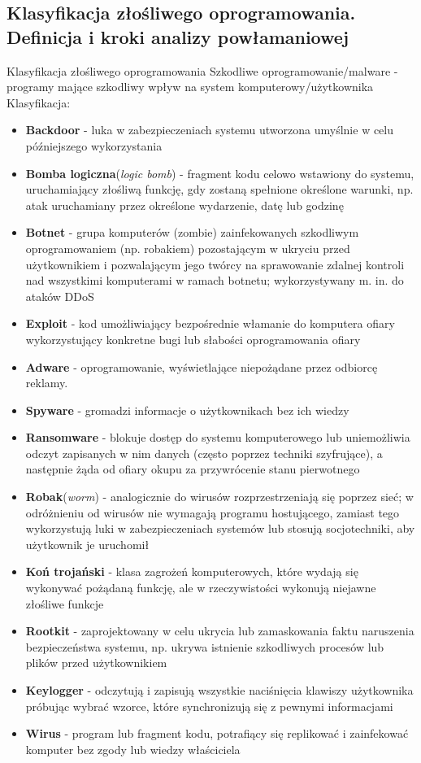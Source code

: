 \subsection{Klasyfikacja złośliwego oprogramowania. Definicja i kroki analizy powłamaniowej}

Klasyfikacja złośliwego oprogramowania Szkodliwe oprogramowanie/malware - programy mające szkodliwy wpływ na system komputerowy/użytkownika Klasyfikacja: 

\begin{itemize}
	\item \textbf{Backdoor} - luka w zabezpieczeniach systemu utworzona umyślnie w celu późniejszego wykorzystania 
	\item \textbf{Bomba logiczna}(\textit{logic bomb}) - fragment kodu celowo wstawiony do systemu, uruchamiający złośliwą funkcję, gdy zostaną spełnione określone warunki, np. atak uruchamiany przez określone wydarzenie, datę lub godzinę 
	\item \textbf{Botnet} - grupa komputerów (zombie) zainfekowanych szkodliwym oprogramowaniem (np. robakiem) pozostającym w ukryciu przed użytkownikiem i pozwalającym jego twórcy na sprawowanie zdalnej kontroli nad wszystkimi komputerami w ramach botnetu; wykorzystywany m. in. do ataków DDoS 
	\item \textbf{Exploit} - kod umożliwiający bezpośrednie włamanie do komputera ofiary wykorzystujący konkretne bugi lub słabości oprogramowania ofiary 
	\item \textbf{Adware} - oprogramowanie, wyświetlające niepożądane przez odbiorcę reklamy. 
	\item \textbf{Spyware} - gromadzi informacje o użytkownikach bez ich wiedzy 
	\item \textbf{Ransomware} - blokuje dostęp do systemu komputerowego lub uniemożliwia odczyt zapisanych w nim danych (często poprzez techniki szyfrujące), a następnie żąda od ofiary okupu za przywrócenie stanu pierwotnego 
	\item \textbf{Robak}(\textit{worm}) - analogicznie do wirusów rozprzestrzeniają się poprzez sieć; w odróżnieniu od wirusów nie wymagają programu hostującego, zamiast tego wykorzystują luki w zabezpieczeniach systemów lub stosują socjotechniki, aby użytkownik je uruchomił 
	\item \textbf{Koń trojański} - klasa zagrożeń komputerowych, które wydają się wykonywać pożądaną funkcję, ale w rzeczywistości wykonują niejawne złośliwe funkcje 
	\item \textbf{Rootkit} - zaprojektowany w celu ukrycia lub zamaskowania faktu naruszenia bezpieczeństwa systemu, np. ukrywa istnienie szkodliwych procesów lub plików przed użytkownikiem 
	\item \textbf{Keylogger} - odczytują i zapisują wszystkie naciśnięcia klawiszy użytkownika próbując wybrać wzorce, które synchronizują się z pewnymi informacjami 
	\item \textbf{Wirus} - program lub fragment kodu, potrafiący się replikować i zainfekować komputer bez zgody lub wiedzy właściciela 
\end{itemize}

